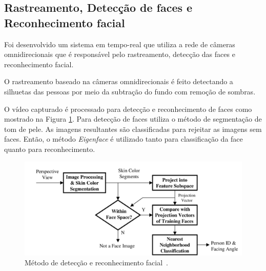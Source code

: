 \subsection{Rastreamento, Detecção de faces e Reconhecimento facial}
 
Foi desenvolvido um sistema em tempo-real que utiliza a rede de câmeras omnidirecionais que é responsável pelo rastreamento, detecção das faces e reconhecimento facial. 

O rastreamento baseado na câmeras omnidirecionais é feito detectando a silhuetas das pessoas por meio da subtração do fundo com remoção de sombras.

O vídeo capturado é processado para detecção e reconhecimento de faces como mostrado na Figura \ref{facerec}. Para detecção de faces utiliza o método de segmentação de tom de pele. As imagens resultantes são classificadas para rejeitar as imagens sem faces. Então, o método \textit{Eigenface} é utilizado tanto para classificação da face quanto para reconhecimento. 

	\begin{figure}[hbt]
		\begin{center}
			\includegraphics[scale=0.8]{figuras/3.TrabalhosCorrelatos/facerec.png}
		\end{center}
		\caption{Método de detecção e reconhecimento facial~\cite{trivedi}.}
		\label{facerec}
	\end{figure}














































